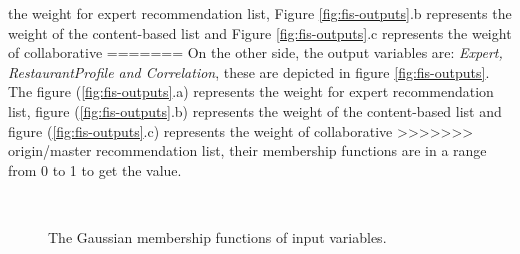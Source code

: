 the weight for expert recommendation list, Figure  \ref{fig:fis-outputs}.b 
represents the weight of the content-based list and 
Figure  \ref{fig:fis-outputs}.c  represents the weight of collaborative
=======
On the other side, the output variables are: \textit{Expert,
RestaurantProfile and Correlation}, these are depicted in figure
\ref{fig:fis-outputs}. The figure (\ref{fig:fis-outputs}.a) represents
the weight for expert recommendation list, figure (\ref{fig:fis-outputs}.b) 
represents the weight of the content-based list and figure
(\ref{fig:fis-outputs}.c) represents the weight of collaborative
>>>>>>> origin/master
recommendation list, their membership functions are in a range from 0
to 1 to get the value.
\begin{figure}[ht!]
   \captionsetup{font=footnotesize}
   \centering
   \hspace{0.1\linewidth}
   \\%
   \caption{The Gaussian membership functions of input variables.
   }
   \label{fig:fis-inputs} 
\end{figure}
